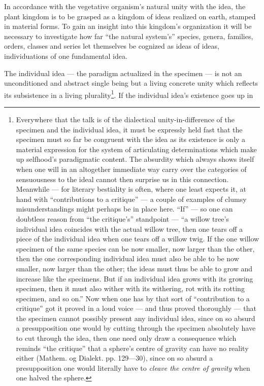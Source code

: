 \documentclass[12pt,a4paper]{book}
\begin{document}
In accordance with the vegetative organism's natural unity with the idea, the
plant kingdom is to be grasped as a kingdom of ideas realized on earth, stamped in
material forms. To gain an insight into this kingdom's organization it will be
necessary to investigate how far ``the natural system's'' species, genera,
families, orders, classes and series let themselves be cognized as ideas of ideas,
individuations of one fundamental idea.

The individual idea --- the paradigm actualized in the specimen --- is not an
unconditioned and abstract single being but a living concrete unity which reflects
its subsistence in a living plurality\footnote{Everywhere that the talk is of the
dialectical unity-in-difference of the specimen and the individual idea, it must be
expressly held fast that the specimen must so far be congruent with the idea as its
existence is only a material expression for the system of articulating
determinations which make up selfhood's paradigmatic content. The absurdity which
always shows itself when one will in an altogether immediate way carry over the
categories of sensuousness to the ideal cannot then surprise us in this connection.
Meanwhile --- for literary bestiality is often, where one least expects it, at hand
with ``contributions to a critique'' --- a couple of examples of clumsy
misunderstandings might perhaps be in place here. ``If'' --- so one can doubtless
reason from ``the critique's'' standpoint --- ``a willow tree's individual idea
coincides with the actual willow tree, then one tears off a piece of the individual
idea when one tears off a willow twig. If the one willow specimen of the same
species can be now smaller, now larger than the other, then the one corresponding
individual idea must also be able to be now smaller, now larger than the other; the
ideas must thus be able to grow and increase like the specimens. But if an
individual idea grows with its growing specimen, then it must also wither with its
withering, rot with its rotting specimen, and so on.'' Now when one has by that
sort of ``contribution to a critique'' got it proved in a loud voice --- and thus
proved thoroughly --- that the specimen cannot possibly present any individual
idea, since on so absurd a presupposition one would by cutting through the specimen
absolutely have to cut through the idea, then one need only draw a consequence which
reminds ``the critique'' that a sphere's centre of gravity can have no reality
either (Mathem. og Dialekt. pp. 129---30), since on so absurd a presupposition one
would literally have to \emph{cleave the centre of gravity} when one halved the
sphere.}. If the individual idea's existence goes up in
\end{document}
